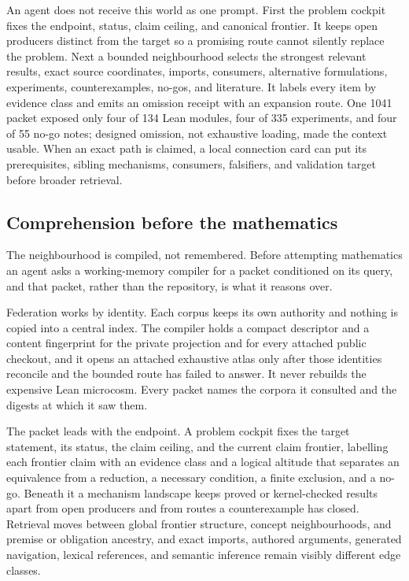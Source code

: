 \documentclass[10pt]{article}
\begin{document}
An agent does not receive this world as one prompt. First the problem cockpit
fixes the endpoint, status, claim ceiling, and canonical frontier. It keeps open
producers distinct from the target so a promising route cannot silently replace
the problem. Next a bounded neighbourhood selects the strongest relevant
results, exact source coordinates, imports, consumers, alternative formulations,
experiments, counterexamples, no-gos, and literature. It labels every item by
evidence class and emits an omission receipt with an expansion route. One 1041
packet exposed only four of 134 Lean modules, four of 335 experiments, and four
of 55 no-go notes; designed omission, not exhaustive loading, made the context
usable. When an exact path is claimed, a local connection card can put its
prerequisites, sibling mechanisms, consumers, falsifiers, and validation target
before broader retrieval.

\subsection{Comprehension before the mathematics}

The neighbourhood is compiled, not remembered. Before attempting mathematics an
agent asks a working-memory compiler for a packet conditioned on its query, and
that packet, rather than the repository, is what it reasons over.

Federation works by identity. Each corpus keeps its own authority and nothing
is copied into a central index. The compiler holds a compact descriptor and a
content fingerprint for the private projection and for every attached public
checkout, and it opens an attached exhaustive atlas only after those identities
reconcile and the bounded route has failed to answer. It never rebuilds the
expensive Lean microcosm. Every packet names the corpora it consulted and the
digests at which it saw them.

The packet leads with the endpoint. A problem cockpit fixes the target
statement, its status, the claim ceiling, and the current claim frontier,
labelling each frontier claim with an evidence class and a logical altitude
that separates an equivalence from a reduction, a necessary condition, a finite
exclusion, and a no-go. Beneath it a mechanism landscape keeps proved or
kernel-checked results apart from open producers and from routes a
counterexample has closed. Retrieval moves between global frontier structure,
concept neighbourhoods, and premise or obligation ancestry, and exact imports,
authored arguments, generated navigation, lexical references, and semantic
inference remain visibly different edge classes.
\end{document}
